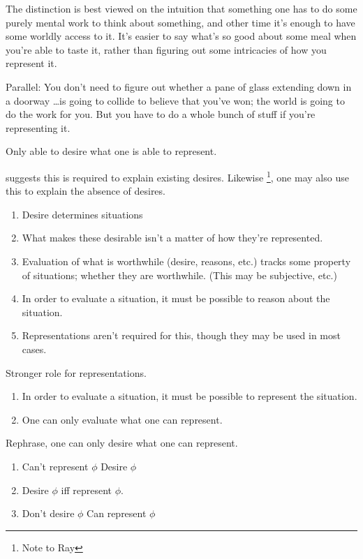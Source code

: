 \documentclass[10pt]{article}
\begin{document}
The distinction is best viewed on the intuition that something one has to do some purely mental work to think about something, and other time it's enough to have some worldly access to it.
It's easier to say what's so good about some meal when you're able to taste it, rather than figuring out some intricacies of how you represent it.

Parallel: You don't need to figure out whether a pane of glass extending down in a doorway \dots is going to collide to believe that you've won; the world is going to do the work for you.
But you have to do a whole bunch of stuff if you're representing it.






Only able to desire what one is able to represent.

\citeauthor{Schroeder:2004aa} suggests this is required to explain existing desires.
Likewise\nolinebreak
\footnote{Note to Ray}, one may also use this to explain the absence of desires.


\begin{enumerate}
\item Desire determines situations
\item What makes these desirable isn't a matter of how they're represented.

\item Evaluation of what is worthwhile (desire, reasons, etc.) tracks some property of situations; whether they are worthwhile. (This may be subjective, etc.)
\item In order to evaluate a situation, it must be possible to reason about the situation.
\item Representations aren't required for this, though they may be used in most cases.
\end{enumerate}

Stronger role for representations.

\begin{enumerate}
\item In order to evaluate a situation, it must be possible to represent the situation.
\item One can only evaluate what one can represent.
\end{enumerate}

Rephrase, one can only desire what one can represent.

\begin{center}
  \begin{enumerate}[label=]
  \item Can't represent \(\phi\) \qquad Desire \(\phi\)
  \item Desire \(\phi\) iff represent \(\phi\).
  \item Don't desire \(\phi\) \qquad Can represent \(\phi\)
  \end{enumerate}
\end{center}
\end{document}
